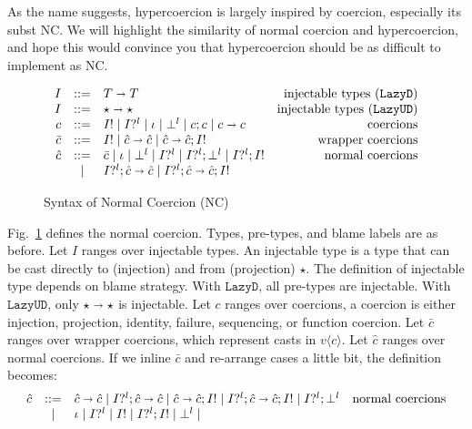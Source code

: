 \documentclass[acmsmall,review,anonymous]{acmart}\settopmatter{printfolios=true,printccs=false,printacmref=false}
\newcommand{\figref}[1]{Fig.~\ref{#1}}
\newcommand{\stxrule}[3]{#1 & ::= & #3 & \text{#2}\\}
\newcommand{\stxrulecont}[1]{& | & #1 & \\}
\newcommand{\plus}[0]{+}
\newcommand{\lazyUD}{$\mathtt{Lazy UD}$}
\newcommand{\lazyD}{$\mathtt{Lazy D}$}
\newcommand{\TOOdyn}[0]{\star}
\newcommand{\POOfun}[2]{#1 \shortrightarrow #2}
\newcommand{\POOprod}[2]{#1 \times #2}
\newcommand{\POOsum}[2]{#1 \plus #2}
\newcommand{\vOOcast}[2]{#1\langle#2\rangle}
\newcommand{\ncProj}[2]{#1?^{#2}}
\newcommand{\ncInj}[1]{#1!}
\newcommand{\ncId}[0]{\iota}
\newcommand{\ncSeq}[2]{#1;#2}
\newcommand{\ncFail}[1]{\bot^{#1}}
\newcommand{\ncFun}[2]{\POOfun{#1}{#2}}
\newcommand{\ncProd}[2]{\POOprod{#1}{#2}}
\newcommand{\ncSum}[2]{\POOsum{#1}{#2}}
\begin{document}
As the name suggests, 
hypercoercion is largely inspired by coercion, especially its subst NC. We 
will highlight the similarity of normal coercion and hypercoercion, and hope 
this would convince you that hypercoercion should be as difficult to implement 
as NC.

\begin{figure}
	\[
	\begin{array}{rclr}
	\stxrule{I}{injectable types (\lazyD)}{
		\POOfun{T}{T}}
	\stxrule{I}{injectable types (\lazyUD)}{
		\POOfun{\TOOdyn}{\TOOdyn}
	}
	\stxrule{c}{coercions}{
		\ncInj{I} \mid
		\ncProj{I}{l} \mid
		\ncId \mid
		\ncFail{l} \mid
		\ncSeq{c}{c} \mid
		\ncFun{c}{c}
	}
	\stxrule{\bar{c}}{wrapper coercions}{	
		\ncInj{I} \mid
		\ncFun{\hat{c}}{\hat{c}} \mid
		\ncSeq{\ncFun{\hat{c}}{\hat{c}}}{\ncInj{I}}
	}
	\stxrule{\hat{c}}{normal coercions}{
		\bar{c} \mid
		\ncId \mid
		\ncFail{l} \mid
		\ncProj{I}{l} \mid
		\ncSeq{\ncProj{I}{l}}{\ncFail{l}} \mid
		\ncSeq{\ncProj{I}{l}}{\ncInj{I}}
	}
	\stxrulecont{
		\ncSeq{\ncProj{I}{l}}{\ncFun{\hat{c}}{\hat{c}}} \mid
		\ncSeq{\ncProj{I}{l}}{\ncSeq{\ncFun{\hat{c}}{\hat{c}}}{\ncInj{I}}}
	}
	\end{array}
	\]
	\caption{Syntax of Normal Coercion (NC)}
	\label{fig:normal-coercion}
\end{figure}

\figref{fig:normal-coercion} defines the normal coercion. 
Types, pre-types, and blame labels are as before.
Let $ I $ ranges over injectable types. An injectable type is a type that can 
be cast directly to (injection) and from (projection) $ \TOOdyn $. The 
definition of injectable type depends on blame strategy. With \lazyD, all 
pre-types are injectable. With \lazyUD, only $ \POOfun{\TOOdyn}{\TOOdyn} $ 
is injectable. 
Let $ c $ ranges over coercions, a coercion is either injection, projection, 
identity, failure, sequencing, or function coercion.
Let $ \bar{c} $ ranges over wrapper coercions, which represent casts in $ 
\vOOcast{v}{c} $.
Let $ \hat{c} $ ranges over normal coercions. If we inline $ \bar{c} $ and 
re-arrange cases a little bit, the definition becomes:
\[
\begin{array}{rclr}
\stxrule{\hat{c}}{normal coercions}{
	\ncFun{\hat{c}}{\hat{c}} \mid
	\ncSeq{\ncProj{I}{l}}{\ncFun{\hat{c}}{\hat{c}}} \mid
	\ncSeq{\ncFun{\hat{c}}{\hat{c}}}{\ncInj{I}} \mid
	\ncSeq{\ncProj{I}{l}}{\ncSeq{\ncFun{\hat{c}}{\hat{c}}}{\ncInj{I}}} \mid
	\ncSeq{\ncProj{I}{l}}{\ncFail{l}}
}
\stxrulecont{
	\ncId \mid
	\ncProj{I}{l} \mid
	\ncInj{I} \mid
	\ncSeq{\ncProj{I}{l}}{\ncInj{I}} \mid
	\ncFail{l} \mid
}
\end{array}
\]
\end{document}

